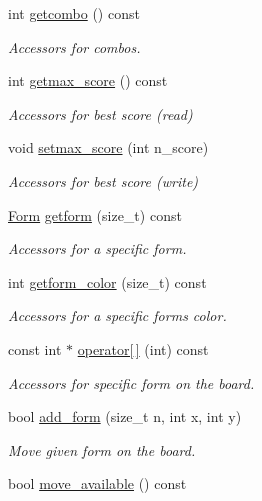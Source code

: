 \begin{DoxyCompactItemize}
int \hyperlink{classmain_game_a6533cd298cbfcf88793f98f6831153fd}{getcombo} () const
\begin{DoxyCompactList}\small\item\em Accessors for combos. \end{DoxyCompactList}\item 
int \hyperlink{classmain_game_a4991a14c51d954adc65fbef4a0235a89}{getmax\+\_\+score} () const
\begin{DoxyCompactList}\small\item\em Accessors for best score (read) \end{DoxyCompactList}\item 
void \hyperlink{classmain_game_aeeb30e985566da9dea9679c6868f22a0}{setmax\+\_\+score} (int n\+\_\+score)
\begin{DoxyCompactList}\small\item\em Accessors for best score (write) \end{DoxyCompactList}\item 
\hyperlink{class_form}{Form} \hyperlink{classmain_game_a961f1b96d73ad87965008691c7a653a7}{getform} (size\+\_\+t) const
\begin{DoxyCompactList}\small\item\em Accessors for a specific form. \end{DoxyCompactList}\item 
int \hyperlink{classmain_game_a195bf2338d8e96d0be3add1b24ccbef5}{getform\+\_\+color} (size\+\_\+t) const
\begin{DoxyCompactList}\small\item\em Accessors for a specific form\textquotesingle{}s color. \end{DoxyCompactList}\item 
const int $\ast$ \hyperlink{classmain_game_aad5671e093ad653e8fb301287ebd83f4}{operator\mbox{[}$\,$\mbox{]}} (int) const
\begin{DoxyCompactList}\small\item\em Accessors for specific form on the board. \end{DoxyCompactList}\item 
bool \hyperlink{classmain_game_a9dacdcdcaacc70edfb9483dfc7d561e7}{add\+\_\+form} (size\+\_\+t n, int x, int y)
\begin{DoxyCompactList}\small\item\em Move given form on the board. \end{DoxyCompactList}\item 
bool \hyperlink{classmain_game_a87020eebf5c467534d888a4053ea4603}{move\+\_\+available} () const

\end{DoxyCompactItemize}

